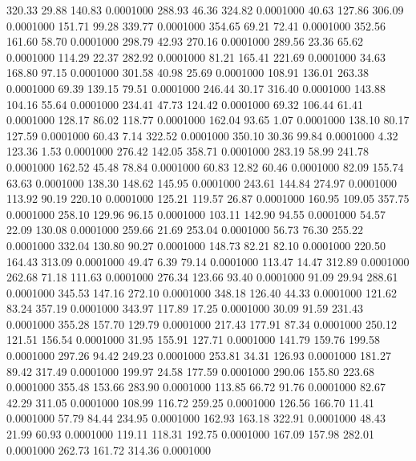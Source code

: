  320.33   29.88  140.83   0.0001000
 288.93   46.36  324.82   0.0001000
  40.63  127.86  306.09   0.0001000
 151.71   99.28  339.77   0.0001000
 354.65   69.21   72.41   0.0001000
 352.56  161.60   58.70   0.0001000
 298.79   42.93  270.16   0.0001000
 289.56   23.36   65.62   0.0001000
 114.29   22.37  282.92   0.0001000
  81.21  165.41  221.69   0.0001000
  34.63  168.80   97.15   0.0001000
 301.58   40.98   25.69   0.0001000
 108.91  136.01  263.38   0.0001000
  69.39  139.15   79.51   0.0001000
 246.44   30.17  316.40   0.0001000
 143.88  104.16   55.64   0.0001000
 234.41   47.73  124.42   0.0001000
  69.32  106.44   61.41   0.0001000
 128.17   86.02  118.77   0.0001000
 162.04   93.65    1.07   0.0001000
 138.10   80.17  127.59   0.0001000
  60.43    7.14  322.52   0.0001000
 350.10   30.36   99.84   0.0001000
   4.32  123.36    1.53   0.0001000
 276.42  142.05  358.71   0.0001000
 283.19   58.99  241.78   0.0001000
 162.52   45.48   78.84   0.0001000
  60.83   12.82   60.46   0.0001000
  82.09  155.74   63.63   0.0001000
 138.30  148.62  145.95   0.0001000
 243.61  144.84  274.97   0.0001000
 113.92   90.19  220.10   0.0001000
 125.21  119.57   26.87   0.0001000
 160.95  109.05  357.75   0.0001000
 258.10  129.96   96.15   0.0001000
 103.11  142.90   94.55   0.0001000
  54.57   22.09  130.08   0.0001000
 259.66   21.69  253.04   0.0001000
  56.73   76.30  255.22   0.0001000
 332.04  130.80   90.27   0.0001000
 148.73   82.21   82.10   0.0001000
 220.50  164.43  313.09   0.0001000
  49.47    6.39   79.14   0.0001000
 113.47   14.47  312.89   0.0001000
 262.68   71.18  111.63   0.0001000
 276.34  123.66   93.40   0.0001000
  91.09   29.94  288.61   0.0001000
 345.53  147.16  272.10   0.0001000
 348.18  126.40   44.33   0.0001000
 121.62   83.24  357.19   0.0001000
 343.97  117.89   17.25   0.0001000
  30.09   91.59  231.43   0.0001000
 355.28  157.70  129.79   0.0001000
 217.43  177.91   87.34   0.0001000
 250.12  121.51  156.54   0.0001000
  31.95  155.91  127.71   0.0001000
 141.79  159.76  199.58   0.0001000
 297.26   94.42  249.23   0.0001000
 253.81   34.31  126.93   0.0001000
 181.27   89.42  317.49   0.0001000
 199.97   24.58  177.59   0.0001000
 290.06  155.80  223.68   0.0001000
 355.48  153.66  283.90   0.0001000
 113.85   66.72   91.76   0.0001000
  82.67   42.29  311.05   0.0001000
 108.99  116.72  259.25   0.0001000
 126.56  166.70   11.41   0.0001000
  57.79   84.44  234.95   0.0001000
 162.93  163.18  322.91   0.0001000
  48.43   21.99   60.93   0.0001000
 119.11  118.31  192.75   0.0001000
 167.09  157.98  282.01   0.0001000
 262.73  161.72  314.36   0.0001000
